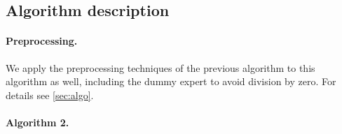 \subsection{Algorithm description}

\paragraph{Preprocessing.} We apply the preprocessing techniques of the previous algorithm to this algorithm as well, including the dummy expert to avoid division by zero. For details see \cref{sec:algo}.

\clearpage

\paragraph{Algorithm 2.} \label{algo-convex}

